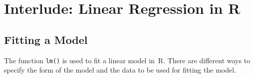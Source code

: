\documentclass[
  a4paper,
]{article}
\theoremstyle{definition}
\theoremstyle{definition}
\theoremstyle{definition}
\theoremstyle{definition}
\theoremstyle{remark}
\begin{document}
\clearpage

\section*{Interlude: Linear Regression in R}\label{I01-lm}

\subsection*{Fitting a Model}\label{lm-fitting}

The function \texttt{lm()} is used to fit a linear model in~R. There are different
ways to specify the form of the model and the data to be used for fitting the
model.
\end{document}
